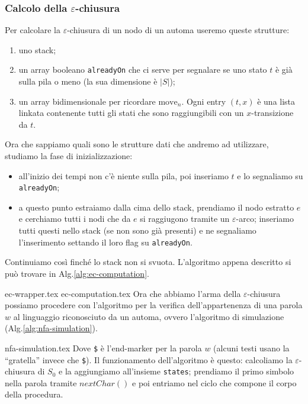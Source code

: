 \documentclass[class=book, crop=false, oneside, 12pt]{standalone}
\begin{document}
\subsubsection{Calcolo della \(\varepsilon\)-chiusura}
Per calcolare la \(\varepsilon\)-chiusura di un nodo di un automa useremo queste strutture:
\begin{enumerate}
    \item uno stack;
    \item un array booleano \texttt{alreadyOn} che ci serve per segnalare se uno stato \(t\) è già sulla pila o meno (la sua dimensione è \(|S|\));
    \item un array bidimensionale per ricordare \(\textrm{move}_n\). Ogni entry \((t,x)\) è una lista linkata contenente tutti gli stati che sono raggiungibili con un \(x\)-transizione da \(t\).
\end{enumerate}
Ora che sappiamo quali sono le strutture dati che andremo ad utilizzare, studiamo la fase di inizializzazione: 
\begin{itemize}
    \item all’inizio dei tempi non c’è niente sulla pila, poi inseriamo \(t\) e lo segnaliamo su \texttt{alreadyOn};
    \item a questo punto estraiamo dalla cima dello stack, prendiamo il nodo estratto \(e\) e cerchiamo tutti i nodi che da \(e\) si raggiugono tramite un \(\varepsilon\)-arco; inseriamo tutti questi nello stack (se non sono già presenti) e ne segnaliamo l'inserimento settando il loro flag su \texttt{alreadyOn}.
\end{itemize}
Continuiamo così finché lo stack non si svuota. L'algoritmo appena descritto si può trovare in Alg.\ref{alg:ec-computation}.

	{ec-wrapper.tex}
	{ec-computation.tex}
Ora che abbiamo l'arma della \(\varepsilon\)-chiusura possiamo procedere con l'algoritmo per la verifica dell'appartenenza di una parola \(w\) al linguaggio riconosciuto da un automa, ovvero l'algoritmo di simulazione (Alg.\ref{alg:nfa-simulation}).

\label{alg:nfa-simulation}
{nfa-simulation.tex}
Dove \texttt{\$} è l’end-marker per la parola \(w\) (alcuni testi usano la “gratella” invece che \texttt{\$}).
Il funzionamento dell'algoritmo è questo: calcoliamo la \(\varepsilon\)-chiusura di \(S_0\) e la aggiungiamo all'insieme \texttt{states}; prendiamo il primo simbolo nella parola tramite \(nextChar()\) e poi entriamo nel ciclo che compone il corpo della procedura.
\end{document}
